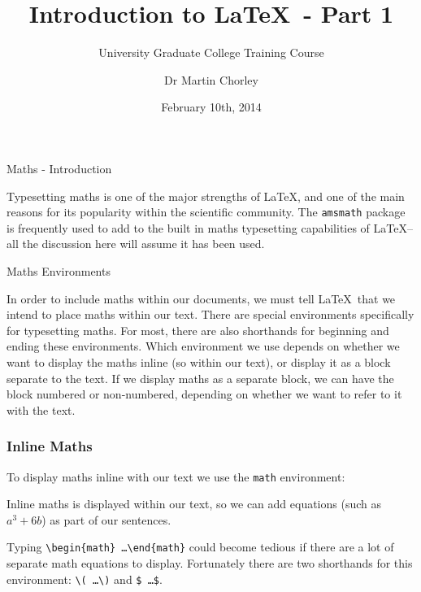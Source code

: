 \documentclass[mathserif]{beamer}
\title{Introduction to \LaTeX\ - Part 1}
\subtitle{University Graduate College Training Course}
\author[Martin Chorley]{Dr Martin Chorley}
\institute[COMSC]{School of Computer Science \& Informatics, Cardiff University}
\date[10/02/14]{February 10th, 2014}
\begin{document}
	

\begin{frame}{Maths - Introduction}

\vfill
Typesetting maths is one of the major strengths of \LaTeX, and one of the main reasons for its popularity within the scientific community.
\vfill
The \texttt{amsmath} package is frequently used to add to the built in maths typesetting capabilities of \LaTeX -- all the discussion here will assume it has been used.
\vfill
\end{frame}

\begin{frame}{Maths Environments}

\vfill
In order to include maths within our documents, we must tell \LaTeX\ that we intend to place maths within our text. 
\vfill
There are special environments specifically for typesetting maths. For most, there are also shorthands for beginning and ending these environments.
\vfill
Which environment we use depends on whether we want to display the maths inline (so within our text), or display it as a block separate to the text. 
\vfill
If we display maths as a separate block, we can have the block numbered or non-numbered, depending on whether we want to refer to it with the text.
\vfill
\end{frame}

\begin{frame}[fragile]
\frametitle{Inline Maths}
\vfill
To display maths inline with our text we use the \texttt{math} environment:
\vfill
	\begin{LTXexample}[style=latexsty]
		Inline maths is displayed within our text, so we can add equations (such as \begin{math} a^3 + 6b \end{math}) as part of our sentences.
	\end{LTXexample}
\vfill
Typing \texttt{{\textbackslash}begin\{math\} \ldots {\textbackslash}end\{math\}} could become tedious if there are a lot of separate math equations to display. Fortunately there are two shorthands for this environment: \texttt{{\textbackslash}( \ldots {\textbackslash})} and \texttt{\$ \ldots \$}.
\vfill
\end{frame}
\end{document}

